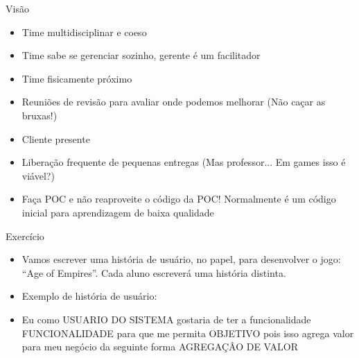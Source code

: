 \begin{frame}
\begin{block}{Visão}
	 \begin{itemize}
			\item Time multidisciplinar e coeso

			\item Time sabe se gerenciar sozinho, gerente é um facilitador
			
			\item Time fisicamente próximo
			
			\item Reuniões de revisão para avaliar onde podemos melhorar (Não caçar as bruxas!)
			
			\item Cliente presente
			
			\item Liberação frequente de pequenas entregas (Mas professor... Em games isso é viável?)
			
			\item Faça POC e não reaproveite o código da POC! Normalmente é um código inicial para aprendizagem de baixa qualidade

	 \end{itemize}
\end{block}
\end{frame}


\begin{frame}
\begin{block}{Exercício}
	 \begin{itemize}
		\item Vamos escrever uma história de usuário, no papel, para desenvolver o jogo: “Age of Empires”. Cada aluno escreverá uma história distinta.

		\item Exemplo de história de usuário:
		
		\item Eu como {USUARIO DO SISTEMA} gostaria de ter a funcionalidade {FUNCIONALIDADE} para que  me permita  {OBJETIVO} pois isso agrega valor para meu negócio da seguinte forma {AGREGAÇÂO DE VALOR}
	 \end{itemize}
\end{block}
\end{frame}

